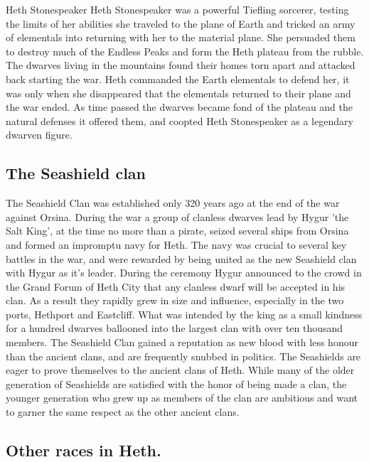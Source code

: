 \documentclass[10pt,twoside,twocolumn,openany,justified,bg=full,nomultitoc]{dndbook}
\begin{document}
\begin{paperbox}[float=!t]{Heth Stonespeaker}\label{Heth-Stonespeaker}
Heth Stonespeaker was a powerful Tiefling sorcerer, testing the limits of her abilities she traveled to the plane of Earth and tricked an army of elementals into returning with her to the material plane. She persuaded them to destroy much of the Endless Peaks and form the Heth plateau from the rubble. The dwarves living in the mountains found their homes torn apart and attacked back starting the war. Heth commanded the Earth elementals to defend her, it was only when she disappeared that the elementals returned to their plane and the war ended. As time passed the dwarves became fond of the plateau and the natural defenses it offered them, and coopted Heth Stonespeaker as a legendary dwarven figure.
\end{paperbox}

\subsection{The Seashield clan}
\label{sec-2-2-2}
The Seashield Clan was established only 320 years ago at the end of the war against Orsina. During the war a group of clanless dwarves lead by Hygur 'the Salt King', at the time no more than a pirate, seized several ships from Orsina and formed an impromptu navy for Heth.
The navy was crucial to several key battles in the war, and were rewarded by being united as the new Seashield clan with Hygur as it's leader. During the ceremony Hygur announced to the crowd in the Grand Forum of Heth City that any clanless dwarf will be accepted in his clan. As a result they rapidly grew in size and influence, especially in the two ports, Hethport and Eastcliff. What was intended by the king as a small kindness for a hundred dwarves ballooned into the largest clan with over ten thousand members.
The Seashield Clan gained a reputation as new blood with less honour than the ancient clans, and are frequently snubbed in politics. 
The Seashields are eager to prove themselves to the ancient clans of Heth. While many of the older generation of Seashields are satisfied with the honor of being made a clan, the younger generation who grew up as members of the clan are ambitious and want to garner the same respect as the other ancient clans.


\subsection{Other races in Heth.}
\label{sec-2-2-3}
\end{document}

